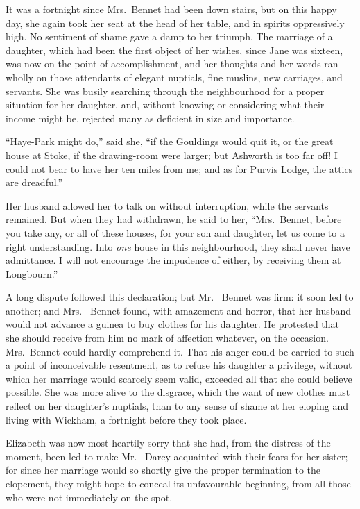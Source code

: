 It was a fortnight since Mrs.\ Bennet had been down
stairs, but on this happy day, she again took her seat at
the head of her table, and in spirits oppressively high.
No sentiment of shame gave a damp to her triumph.
The marriage of a daughter, which had been the first
object of her wishes, since Jane was sixteen, was now on
the point of accomplishment, and her thoughts and her
words ran wholly on those attendants of elegant nuptials,
fine muslins, new carriages, and servants. She was busily
searching through the neighbourhood for a proper situation
for her daughter, and, without knowing or considering
what their income might be, rejected many as deficient
in size and importance.

“Haye-Park might do,” said she, “if the Gouldings
would quit it, or the great house at Stoke, if the drawing-room
were larger; but Ashworth is too far off! I could
not bear to have her ten miles from me; and as for Purvis
Lodge, the attics are dreadful.”

Her husband allowed her to talk on without interruption,
while the servants remained. But when they had
withdrawn, he said to her, “Mrs.\ Bennet, before you take
any, or all of these houses, for your son and daughter,
let us come to a right understanding. Into \textit{one} house in
this neighbourhood, they shall never have admittance.
I will not encourage the impudence of either, by receiving
them at Longbourn.”

A long dispute followed this declaration; but Mr.\ %
Bennet was firm: it soon led to another; and Mrs.\ %
Bennet found, with amazement and horror, that her
husband would not advance a guinea to buy clothes for
his daughter. He protested that she should receive from
him no mark of affection whatever, on the occasion.
Mrs.\ Bennet could hardly comprehend it. That his anger
could be carried to such a point of inconceivable resentment,
as to refuse his daughter a privilege, without which
her marriage would scarcely seem valid, exceeded all that
she could believe possible. She was more alive to the
disgrace, which the want of new clothes must reflect on
her daughter’s nuptials, than to any sense of shame at
her eloping and living with Wickham, a fortnight before
they took place.

Elizabeth was now most heartily sorry that she had,
from the distress of the moment, been led to make Mr.\ %
Darcy acquainted with their fears for her sister; for
since her marriage would so shortly give the proper
termination to the elopement, they might hope to conceal
its unfavourable beginning, from all those who were not
immediately on the spot.

